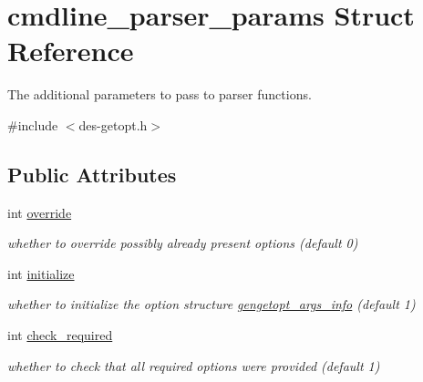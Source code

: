 \hypertarget{structcmdline__parser__params}{}\section{cmdline\+\_\+parser\+\_\+params Struct Reference}
\label{structcmdline__parser__params}


The additional parameters to pass to parser functions.  




{\ttfamily \#include $<$des-\/getopt.\+h$>$}

\subsection*{Public Attributes}
\begin{DoxyCompactItemize}
\item 
\mbox{\label{structcmdline__parser__params_ad3ff9d69146e69a47506782197b5675c}} 
int \hyperlink{structcmdline__parser__params_ad3ff9d69146e69a47506782197b5675c}{override}
\begin{DoxyCompactList}\small\item\em whether to override possibly already present options (default 0) \end{DoxyCompactList}\item 
\mbox{\label{structcmdline__parser__params_a97ed8a6eabd39291ae7d73f273e12c11}} 
int \hyperlink{structcmdline__parser__params_a97ed8a6eabd39291ae7d73f273e12c11}{initialize}
\begin{DoxyCompactList}\small\item\em whether to initialize the option structure \hyperlink{structgengetopt__args__info}{gengetopt\+\_\+args\+\_\+info} (default 1) \end{DoxyCompactList}\item 
\mbox{\label{structcmdline__parser__params_a44ff439d7e9e36799e59173af74829c6}} 
int \hyperlink{structcmdline__parser__params_a44ff439d7e9e36799e59173af74829c6}{check\+\_\+required}
\begin{DoxyCompactList}\small\item\em whether to check that all required options were provided (default 1) \end{DoxyCompactList}\item 

\end{DoxyCompactItemize}
